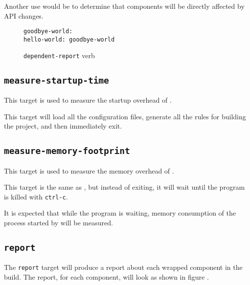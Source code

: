 Another use would be to determine that components will be directly
affected by API changes.

\begin{figure}[tbh]
\hrulefill
\begin{verbatim}
goodbye-world:
hello-world: goodbye-world
\end{verbatim}
\hrulefill
\caption{\texttt{dependent-report} verb}\label{usinglmsbw:dependents-verb}
\end{figure}


\subsection{\texttt{measure-startup-time}}\label{usinglmsbw:measure-startup-time}

This target is used to measure the startup overhead of \lmsbw.

This target will load all the configuration files, generate all the
rules for building the project, and then immediately exit.

\subsection{\texttt{measure-memory-footprint}}

This target is used to measure the memory overhead of \lmsbw.

This target is the same as , but
instead of exiting, it will wait until the program is killed with
\texttt{ctrl-c}.

It is expected that while the program is waiting, memory consumption
of the \make process started by \lmsbw will be measured.

\subsection{\texttt{report}}\label{usinglmsbw:report}

The \texttt{report} target will produce a report about each wrapped
component in the build.  The report, for each component, will look
as shown in figure .

